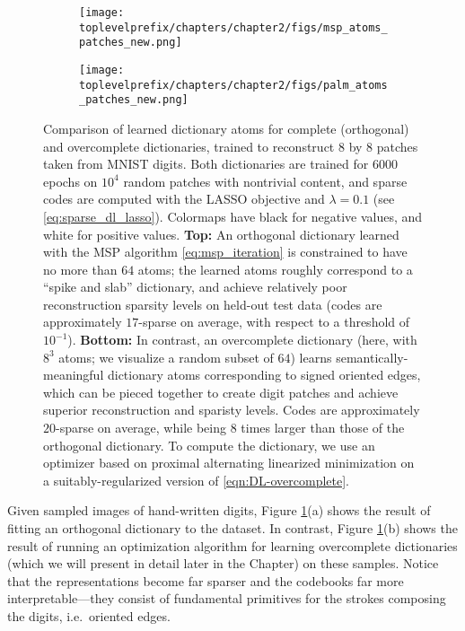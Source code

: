 \documentclass[../../book-main.tex]{subfiles}
\begin{document}
\begin{figure}[t]
\centering
    \begin{subfigure}{0.9\linewidth}
        \centering
        \texttt{[image: \\toplevelprefix/chapters/chapter2/figs/msp\_atoms\_patches\_new.png]}
        \caption{}
    \end{subfigure}
    \begin{subfigure}{0.9\linewidth}
        \centering
        \texttt{[image: \\toplevelprefix/chapters/chapter2/figs/palm\_atoms\_patches\_new.png]}
        \caption{}
    \end{subfigure}
    \caption{Comparison of learned dictionary atoms for complete (orthogonal)
    and overcomplete dictionaries, trained to reconstruct $8$ by $8$ patches taken from
    MNIST digits. Both dictionaries are trained for $6000$ epochs on $10^4$ random patches with
    nontrivial content, and sparse codes are computed with the LASSO objective
    and $\lambda=0.1$ (see \eqref{eq:sparse_dl_lasso}). Colormaps have black for negative values, and white for
    positive values. \textbf{Top:} An orthogonal dictionary learned with the
    MSP algorithm \eqref{eq:msp_iteration} is constrained to
    have no more than $64$ atoms; the learned atoms roughly correspond to
    a ``spike and slab'' dictionary, and achieve relatively poor reconstruction sparsity
    levels on held-out test data (codes are approximately $17$-sparse on
    average, with respect to a threshold of $10^{-1}$).
    \textbf{Bottom:} In contrast, an overcomplete dictionary (here, with $8^3$
    atoms; we visualize a random subset of $64$) learns
    semantically-meaningful dictionary atoms corresponding to signed oriented
    edges, which can be pieced together to create digit patches and achieve
    superior reconstruction and sparisty levels. Codes are approximately
    $20$-sparse on
    average, while being $8$ times larger than those of the orthogonal
    dictionary. To compute the
    dictionary, we use an optimizer based on proximal alternating linearized
    minimization on a suitably-regularized version of
    \eqref{eqn:DL-overcomplete}.}
    \label{fig:ReconMNIST}
\end{figure}

\begin{example}
Given sampled images of hand-written digits, Figure \ref{fig:ReconMNIST}(a) shows the result of fitting an orthogonal dictionary to the dataset. 
In contrast, Figure \ref{fig:ReconMNIST}(b) shows the result of running an
optimization algorithm for learning overcomplete dictionaries (which we will
present in detail later in the Chapter) on these samples. 
Notice that the representations become far sparser and the codebooks far more interpretable---they consist of fundamental primitives for the strokes composing the digits, i.e.\ oriented edges.
\end{example}
\end{document}
